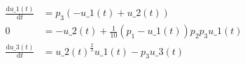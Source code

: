 \begin{align}
\frac{\mathrm{d} u\_{1}\left( t \right)}{\mathrm{d}t} &= p_{3} \left(  - u\_{1}\left( t \right) + u\_{2}\left( t \right) \right) \\
0 &=  - u\_{2}\left( t \right) + \frac{1}{10} \left( p_{1} - u\_{1}\left( t \right) \right) p_{2} p_{3} u\_{1}\left( t \right) \\
\frac{\mathrm{d} u\_{3}\left( t \right)}{\mathrm{d}t} &= u\_{2}\left( t \right)^{\frac{2}{3}} u\_{1}\left( t \right) - p_{3} u\_{3}\left( t \right)
\end{align}
